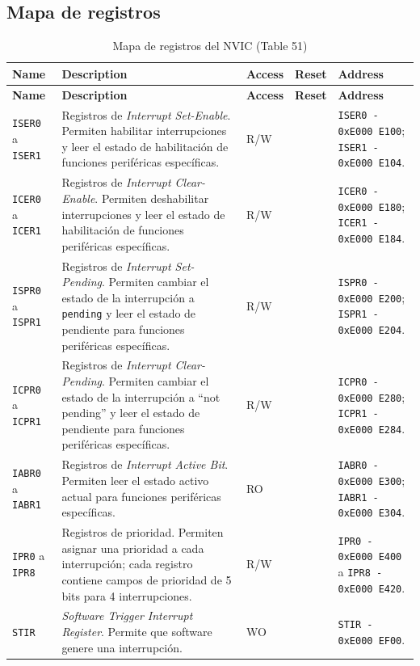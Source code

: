 \subsection{Mapa de registros}
\scriptsize
\renewcommand{\arraystretch}{1.12}
\begin{longtable}{|>{\raggedright\arraybackslash}p{}|>{\raggedright\arraybackslash}p{}|>{\centering\arraybackslash}p{}|>{\centering\arraybackslash}p{}|>{\raggedright\arraybackslash}p{}|}
\caption{Mapa de registros del NVIC (Table 51)} \\
\hline
\textbf{Name} & \textbf{Description} & \textbf{Access} & \textbf{Reset} & \textbf{Address} \\
\hline
\endfirsthead
\hline
\textbf{Name} & \textbf{Description} & \textbf{Access} & \textbf{Reset} & \textbf{Address} \\
\hline
\endhead
\texttt{ISER0} a \texttt{ISER1} & Registros de \textit{Interrupt Set-Enable}. Permiten habilitar interrupciones y leer el estado de habilitaci\'on de funciones perif\'ericas espec\'ificas. & R/W & 0 & \texttt{ISER0 - 0xE000 E100}; \texttt{ISER1 - 0xE000 E104}. \\
\hline
\texttt{ICER0} a \texttt{ICER1} & Registros de \textit{Interrupt Clear-Enable}. Permiten deshabilitar interrupciones y leer el estado de habilitaci\'on de funciones perif\'ericas espec\'ificas. & R/W & 0 & \texttt{ICER0 - 0xE000 E180}; \texttt{ICER1 - 0xE000 E184}. \\
\hline
\texttt{ISPR0} a \texttt{ISPR1} & Registros de \textit{Interrupt Set-Pending}. Permiten cambiar el estado de la interrupci\'on a \texttt{pending} y leer el estado de pendiente para funciones perif\'ericas espec\'ificas. & R/W & 0 & \texttt{ISPR0 - 0xE000 E200}; \texttt{ISPR1 - 0xE000 E204}. \\
\hline
\texttt{ICPR0} a \texttt{ICPR1} & Registros de \textit{Interrupt Clear-Pending}. Permiten cambiar el estado de la interrupci\'on a ``not pending'' y leer el estado de pendiente para funciones perif\'ericas espec\'ificas. & R/W & 0 & \texttt{ICPR0 - 0xE000 E280}; \texttt{ICPR1 - 0xE000 E284}. \\
\hline
\texttt{IABR0} a \texttt{IABR1} & Registros de \textit{Interrupt Active Bit}. Permiten leer el estado activo actual para funciones perif\'ericas espec\'ificas. & RO & 0 & \texttt{IABR0 - 0xE000 E300}; \texttt{IABR1 - 0xE000 E304}. \\
\hline
\texttt{IPR0} a \texttt{IPR8} & Registros de prioridad. Permiten asignar una prioridad a cada interrupci\'on; cada registro contiene campos de prioridad de 5 bits para 4 interrupciones. & R/W & 0 & \texttt{IPR0 - 0xE000 E400} a \texttt{IPR8 - 0xE000 E420}. \\
\hline
\texttt{STIR} & \textit{Software Trigger Interrupt Register}. Permite que software genere una interrupci\'on. & WO & 0 & \texttt{STIR - 0xE000 EF00}. \\
\hline
\end{longtable}
\normalsize

